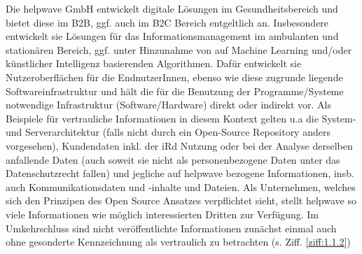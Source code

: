 \documentclass[10pt]{article}
\begin{document}
Die helpwave GmbH entwickelt digitale Lösungen im Gesundheitsbereich und bietet diese im B2B, ggf. auch im B2C Bereich entgeltlich an. Insbesondere entwickelt sie Lösungen für das Informationsmanagement im ambulanten und stationären Bereich, ggf. unter Hinzunahme von auf Machine Learning und/oder künstlicher Intelligenz basierenden Algorithmen. Dafür entwickelt sie Nutzeroberflächen für die EndnutzerInnen, ebenso wie diese zugrunde liegende Softwareinfrastruktur und hält die für die Benutzung der Programme/Systeme notwendige Infrastruktur (Software/Hardware) direkt oder indirekt vor. Als Beispiele für vertrauliche Informationen in diesem Kontext gelten u.a die System- und Serverarchitektur (falls nicht durch ein Open-Source Repository anders vorgesehen), Kundendaten inkl. der iRd Nutzung oder bei der Analyse derselben anfallende Daten (auch soweit sie nicht als personenbezogene Daten unter das Datenschutzrecht fallen) und jegliche auf helpwave bezogene Informationen, insb. auch Kommunikationsdaten und -inhalte und Dateien. Als Unternehmen, welches sich den Prinzipen des Open Source Ansatzes verpflichtet sieht, stellt helpwave so viele Informationen wie möglich interessierten Dritten zur Verfügung. Im Umkehrschluss sind nicht veröffentlichte Informationen zunächst einmal auch ohne gesonderte Kennzeichnung als vertraulich zu betrachten (s. Ziff. \ref{ziff:1.1.2}) 
\end{document}
